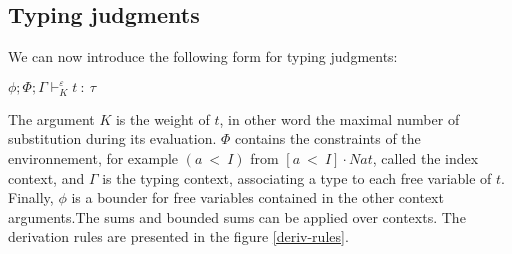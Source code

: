 \documentclass[a4paper,12pt]{article}
\begin{document}
\subsection{Typing judgments}

We can now introduce the following form for typing judgments:

\begin{center}
  $\phi; \Phi; \Gamma \vdash_{K}^{\varepsilon} t~:~\tau$
\end{center}

The argument $K$ is the weight of $t$, in other word the maximal
number of substitution during its evaluation. $\Phi$ contains the
constraints of the environnement, for example $(a~<~I)$ from $[a~<~I]
\cdot Nat$, called the index context, and $\Gamma$ is the typing
context, associating a type to each free variable of $t$.  Finally,
$\phi$ is a bounder for free variables contained in the other context
arguments.The sums and bounded sums can be applied over contexts. The
derivation rules are presented in the figure \ref{deriv-rules}.
\end{document}
